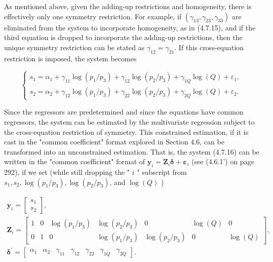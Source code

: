 \documentclass[10pt]{article}
\begin{document}
As mentioned above, given the adding-up restrictions and homogeneity, there is effectively only one symmetry restriction. For example, if $\left(\gamma_{13}, \gamma_{23}, \gamma_{33}\right)$ are\\
eliminated from the system to incorporate homogeneity, as in (4.7.15), and if the third equation is dropped to incorporate the adding-up restrictions, then the unique symmetry restriction can be stated as $\gamma_{12}=\gamma_{21}$. If this cross-equation restriction is imposed, the system becomes

\[
\left\{\begin{array}{l}
s_{1}=\alpha_{1}+\gamma_{11} \log \left(p_{1} / p_{3}\right)+\gamma_{12} \log \left(p_{2} / p_{3}\right)+\gamma_{1 Q} \log (Q)+\varepsilon_{1},  \tag{4.7.16}\\
s_{2}=\alpha_{2}+\gamma_{12} \log \left(p_{1} / p_{3}\right)+\gamma_{22} \log \left(p_{2} / p_{3}\right)+\gamma_{2 Q} \log (Q)+\varepsilon_{2} .
\end{array}\right.
\]

Since the regressors are predetermined and since the equations have common regressors, the system can be estimated by the multivariate regression subject to the cross-equation restriction of symmetry. This constrained estimation, if it is cast in the "common coefficient" format explored in Section 4.6, can be transformed into an unconstrained estimation. That is, the system (4.7.16) can be written in the "common coefficient" format of $\mathbf{y}_{i}=\mathbf{Z}_{i} \boldsymbol{\delta}+\boldsymbol{\varepsilon}_{i}$ (see (4.6.1') on page 292), if we set (while still dropping the " $i$ " subscript from $s_{1}, s_{2}, \log \left(p_{1} / p_{3}\right), \log \left(p_{2} / p_{3}\right)$, and $\log (Q)$ )


\begin{gather*}
\mathbf{y}_{i}=\left[\begin{array}{l}
s_{1} \\
s_{2}
\end{array}\right], \\
\mathbf{Z}_{i}=\left[\begin{array}{ccccccc}
1 & 0 & \log \left(p_{1} / p_{3}\right) & \log \left(p_{2} / p_{3}\right) & 0 & \log (Q) & 0 \\
0 & 1 & 0 & \log \left(p_{1} / p_{3}\right) & \log \left(p_{2} / p_{3}\right) & 0 & \log (Q)
\end{array}\right], \\
\boldsymbol{\delta}^{\prime}=\left[\begin{array}{lllllll}
\alpha_{1} & \alpha_{2} & \gamma_{11} & \gamma_{12} & \gamma_{22} & \gamma_{1 Q} & \gamma_{2 Q}
\end{array}\right] . \tag{4.7.17}
\end{gather*}
\end{document}
